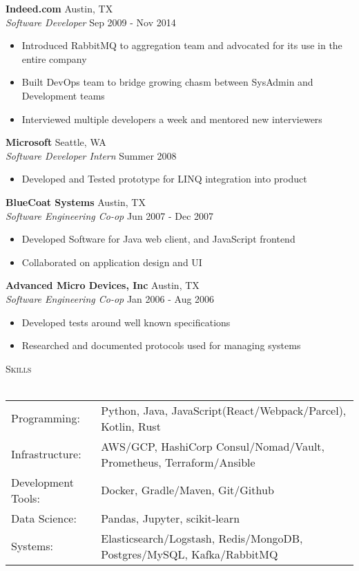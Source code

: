 \documentclass[a4paper]{article}
\newcommand{\lineunder} {
    \vspace*{-8pt} \\
    \hspace*{-18pt} \hrulefill \\
}
\newcommand{\header} [1] {
    {\hspace*{-18pt}\vspace*{6pt} \textsc{#1}}
    \vspace*{-6pt} \lineunder
}
\begin{document}
\textbf{Indeed.com} \hfill Austin, TX\\
\textit{Software Developer} \hfill Sep 2009 - Nov 2014\\
\vspace{-1mm}
\begin{itemize} \itemsep 1pt
\item Introduced RabbitMQ to aggregation team and advocated for its use in the entire company
\item Built DevOps team to bridge growing chasm between SysAdmin and Development teams
\item Interviewed multiple developers a week and mentored new interviewers
\end{itemize}

\textbf{Microsoft} \hfill Seattle, WA\\
\textit{Software Developer Intern} \hfill Summer 2008\\
\vspace{-1mm}
\begin{itemize} \itemsep 1pt
\item Developed and Tested prototype for LINQ integration into product
\end{itemize}

\textbf{BlueCoat Systems} \hfill Austin, TX\\
\textit{Software Engineering Co-op} \hfill Jun 2007 - Dec 2007\\
\vspace{-1mm}
\begin{itemize} \itemsep 1pt
\item Developed Software for Java web client, and JavaScript frontend
\item Collaborated on application design and UI
\end{itemize}

\textbf{Advanced Micro Devices, Inc} \hfill Austin, TX\\
\textit{Software Engineering Co-op} \hfill Jan 2006 - Aug 2006\\
\vspace{-1mm}
\begin{itemize} \itemsep 1pt
\item Developed tests around well known specifications
\item Researched and documented protocols used for managing systems
\end{itemize}

\header{Skills}
\begin{tabular}{ l l }
    Programming: & Python, Java, JavaScript(React/Webpack/Parcel), Kotlin, Rust\\
    Infrastructure: & AWS/GCP, HashiCorp Consul/Nomad/Vault, Prometheus, Terraform/Ansible\\
    Development Tools: & Docker, Gradle/Maven, Git/Github\\
    Data Science: & Pandas, Jupyter, scikit-learn \\
    Systems: & Elasticsearch/Logstash, Redis/MongoDB, Postgres/MySQL, Kafka/RabbitMQ\\
\end{tabular}
\vspace{2mm}
\end{document}
